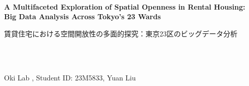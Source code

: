 \documentclass[11pt,a4paper]{article}
\begin{document}
\begin{center}
~\\
{\fontsize{12}{14}\selectfont \textbf{A Multifaceted Exploration of Spatial Openness in Rental Housing: Big Data Analysis Across Tokyo's 23 Wards}}\\
\begin{CJK}{UTF8}{min}
{\fontsize{11}{13}\selectfont 賃貸住宅における空間開放性の多面的探究：東京23区のビッグデータ分析}
\end{CJK}\\
~\\
\end{center}

\begin{flushright}
{\fontsize{11}{13}\selectfont Oki Lab , Student ID: 23M5833, Yuan Liu}
\end{flushright}

~\\
\end{document}
